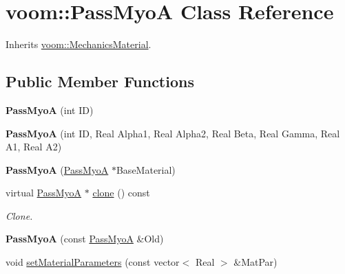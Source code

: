 \hypertarget{classvoom_1_1_pass_myo_a}{
\section{voom::PassMyoA Class Reference}
\label{classvoom_1_1_pass_myo_a}
}


Inherits \hyperlink{classvoom_1_1_mechanics_material}{voom::MechanicsMaterial}.\subsection*{Public Member Functions}
\begin{DoxyCompactItemize}
\item 
\hypertarget{classvoom_1_1_pass_myo_a_a8fd8bc56c5905aa4900e0b86f834d82e}{
{\bfseries PassMyoA} (int ID)}
\label{classvoom_1_1_pass_myo_a_a8fd8bc56c5905aa4900e0b86f834d82e}

\item 
\hypertarget{classvoom_1_1_pass_myo_a_a5308e96dc64aacf0146b5e5df7184bfa}{
{\bfseries PassMyoA} (int ID, Real Alpha1, Real Alpha2, Real Beta, Real Gamma, Real A1, Real A2)}
\label{classvoom_1_1_pass_myo_a_a5308e96dc64aacf0146b5e5df7184bfa}

\item 
\hypertarget{classvoom_1_1_pass_myo_a_a8577f3aeea3cd0bd897e38b9f8ee34e4}{
{\bfseries PassMyoA} (\hyperlink{classvoom_1_1_pass_myo_a}{PassMyoA} $\ast$BaseMaterial)}
\label{classvoom_1_1_pass_myo_a_a8577f3aeea3cd0bd897e38b9f8ee34e4}

\item 
\hypertarget{classvoom_1_1_pass_myo_a_afb1197905decf2727cd8b4270e9bbc92}{
virtual \hyperlink{classvoom_1_1_pass_myo_a}{PassMyoA} $\ast$ \hyperlink{classvoom_1_1_pass_myo_a_afb1197905decf2727cd8b4270e9bbc92}{clone} () const }
\label{classvoom_1_1_pass_myo_a_afb1197905decf2727cd8b4270e9bbc92}

\begin{DoxyCompactList}\small\item\em Clone. \item\end{DoxyCompactList}\item 
\hypertarget{classvoom_1_1_pass_myo_a_a3596d5cad17933f7370a32708cdd4e20}{
{\bfseries PassMyoA} (const \hyperlink{classvoom_1_1_pass_myo_a}{PassMyoA} \&Old)}
\label{classvoom_1_1_pass_myo_a_a3596d5cad17933f7370a32708cdd4e20}

\item 
\hypertarget{classvoom_1_1_pass_myo_a_aed01249dfdcb6fb10df34160872addf6}{
void \hyperlink{classvoom_1_1_pass_myo_a_aed01249dfdcb6fb10df34160872addf6}{setMaterialParameters} (const vector$<$ Real $>$ \&MatPar)}
\label{classvoom_1_1_pass_myo_a_aed01249dfdcb6fb10df34160872addf6}


\end{DoxyCompactItemize}

